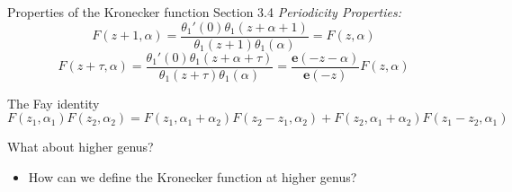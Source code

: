 \documentclass[11pt,aspectratio=169]{beamer}
\newcommand{\ee}[0]{\mathbf{e}}
\begin{document}
\begin{frame}{Properties of the Kronecker function}{\tiny \cite{BL13} Section 3.4}
    \emph{Periodicity Properties:}
    \[F(z+1,\alpha) = \frac{\theta_1'(0)\theta_1(z+\alpha+1)}{\theta_1(z+1)\theta_1(\alpha)} = F(z,\alpha)\]
    \[F(z+\tau,\alpha) = \frac{\theta_1'(0)\theta_1(z+\alpha+\tau)}{\theta_1(z+\tau)\theta_1(\alpha)} = \frac{\ee(-z-\alpha)}{\ee(-z)} F(z,\alpha)\]
    

    \begin{block}{The Fay identity}
        \[F(z_1,\alpha_1)F(z_2,\alpha_2) = F(z_1,\alpha_1+\alpha_2)F(z_2-z_1,\alpha_2)+F(z_2,\alpha_1+\alpha_2)F(z_1-z_2,\alpha_1)\]
    \end{block}


    {
        \begin{block}{What about higher genus?}
            \begin{itemize}
                \item How can we define the Kronecker function at higher genus?
            \end{itemize}
        \end{block}
    }
\end{frame}
\end{document}
